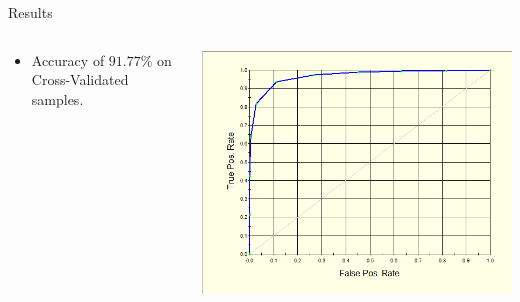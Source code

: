 \documentclass[10pt]{beamer}
\begin{document}
    
    \begin{frame}{Results}
    \begin{columns}[T]
        \begin{column}{.35 \textwidth}
            \begin{itemize}
                \item Accuracy of $91.77\%$ on Cross-Validated samples. 
            \end{itemize}
        \end{column}
        
        \begin{column}{.65\textwidth}
        \begin{center}
            \includegraphics[width = \textwidth]{ROCGBMCV.png}
        \end{center}
        \end{column}
    \end{columns}
    \end{frame}
    
\end{document}

